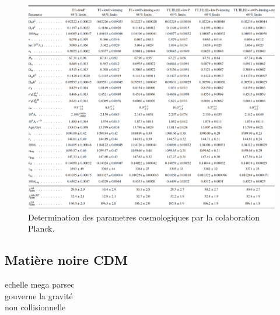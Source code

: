 \begin{figure}[bth]
        \includegraphics[width=.95\linewidth]{img/01/table_planck.pdf} 
        \caption{Determination des parametres cosmologiques par la colaboration Planck.}
 		\label{fig:planck_parameters}
\end{figure}

\citep{planck_collaboration_planck_2016}

\subsection{Matière noire CDM}

echelle mega parsec\\
gouverne la gravité\\
non collisionnelle\\


